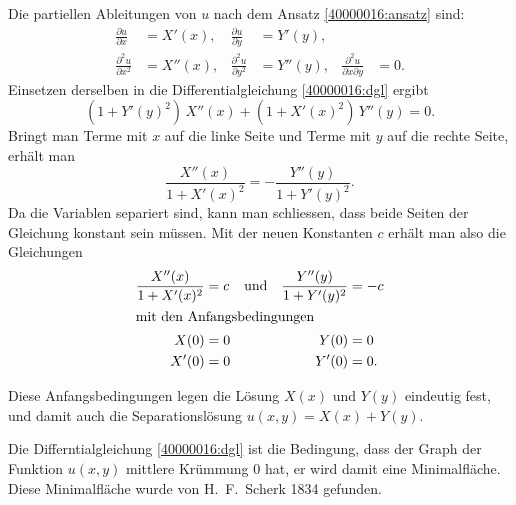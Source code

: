 \begin{loesung}
\begin{teilaufgaben}
\item
Die partiellen Ableitungen von $u$ nach dem Ansatz \eqref{40000016:ansatz}
sind:
\begin{equation*}
\begin{aligned}
\frac{\partial u}{\partial x}
&=
X'(x),
&
\frac{\partial u}{\partial y}
&=
Y'(y),
\\
\frac{\partial^2 u}{\partial x^2}
&=
X''(x),
&
\frac{\partial^2 u}{\partial y^2}
&=
Y''(y),
&
\frac{\partial^2 u}{\partial x\partial y}
&=
0.
\end{aligned}
\end{equation*}
Einsetzen derselben in die Differentialgleichung \eqref{40000016:dgl} 
ergibt
\begin{equation}
(1+Y'(y)^2)\, X''(x) + (1+X'(x)^2)\, Y''(y) = 0.
\end{equation}
Bringt man Terme mit $x$ auf die linke Seite und Terme mit $y$ auf die
rechte Seite, erhält man
\begin{equation}
\frac{X''(x)}{1+X'(x)^2}
=
-\frac{Y''(y)}{1+Y'(y)^2}.
\end{equation}
Da die Variablen separiert sind, kann man schliessen, dass beide Seiten
der Gleichung konstant sein müssen.
Mit der neuen Konstanten $c$ erhält man also die Gleichungen
\begin{align*}
\frac{X''(x)}{1+X'(x)^2} &= c
&
&\text{und}&
\frac{Y''(y)}{1+Y'(y)^2} &= -c
\\
\intertext{mit den Anfangsbedingungen}
X(0) &= 0
&&&
Y(0) &= 0
\\
X'(0) &= 0
&&&
Y'(0) &= 0.
\end{align*}
\item
Diese Anfangsbedingungen legen die Lösung $X(x)$ und $Y(y)$ eindeutig
fest, und damit auch die Separationslösung $u(x,y)=X(x) + Y(y)$.
\qedhere
\end{teilaufgaben}
\end{loesung}

\begin{diskussion}
Die Differntialgleichung \eqref{40000016:dgl} ist die Bedingung, dass der
Graph der Funktion $u(x,y)$ mittlere Krümmung $0$ hat, er wird damit eine
Minimalfläche.
Diese Minimalfläche wurde von H.~F.~Scherk 1834 gefunden.
\end{diskussion}
